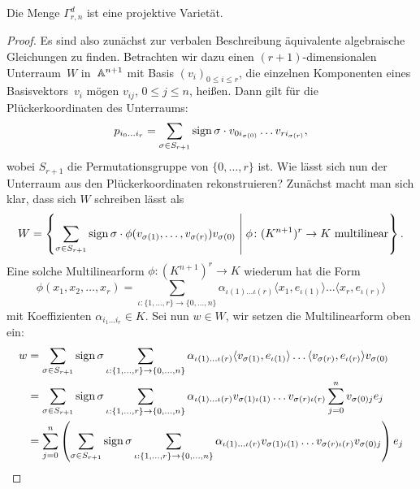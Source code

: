 \begin{fact} \label{fact:gammaproj}
Die Menge $\Gamma_{r,n}^d$ ist eine projektive Varietät.
\end{fact}
\begin{proof}
Es sind also zunächst zur verbalen Beschreibung äquivalente algebraische Gleichungen zu finden. Betrachten wir dazu einen $(r+1)$-dimensionalen Unterraum~$W$ in~$\mathbb A^{n+1}$ mit Basis $(v_i)_{0 \leq i \leq r}$, die einzelnen Komponenten eines Basisvektors~$v_i$ mögen $v_{ij}$, $0 \leq j \leq n$, heißen. Dann gilt für die Plückerkoordinaten des Unterraums:
\begin{equation}
p_{i_0 \dots i_r} = \sum_{\sigma \in S_{r+1}} \operatorname{sign} \sigma \cdot v_{0i_{\sigma(0)}} \dots v_{ri_{\sigma(r)}},
\end{equation}
wobei $S_{r+1}$ die Permutationsgruppe von $\{0,\dots,r\}$ ist. Wie lässt sich nun der Unterraum aus den Plückerkoordinaten rekonstruieren? Zunächst macht man sich klar, dass sich $W$ schreiben lässt als
\begin{equation}
W = \left\{ \sum\limits_{\sigma \in S_{r+1}} \operatorname{sign} \sigma \cdot \phi(v_{\sigma(1)}, \dots, v_{\sigma(r)}) v_{\sigma(0)} \;\middle|\; \phi \colon (K^{n+1})^r \rightarrow K \text{ multilinear} \right\}.
\end{equation}
Eine solche Multilinearform $\phi \colon (K^{n+1})^r \to K$ wiederum hat die Form
\begin{equation}
\phi(x_1, x_2, \dots, x_r) = \sum_{\iota: \{1, \dots, r\} \to \{0, \dots, n\}} \alpha_{\iota(1) \dots \iota(r)} \langle x_1, e_{\iota(1)} \rangle \dots \langle x_r, e_{\iota(r)} \rangle
\end{equation}
mit Koeffizienten $\alpha_{i_1 \dots i_r} \in K$. Sei nun $w \in W$, wir setzen die Multilinearform oben ein:
\begin{align*}
w &= \sum\limits_{\sigma \in S_{r+1}} \sign \sigma \sum_{\iota: \{1, \dots, r\} \to \{0, \dots, n\}} \alpha_{\iota(1) \dots \iota(r)} \langle v_{\sigma(1)}, e_{\iota(1)} \rangle \dots \langle v_{\sigma(r)}, e_{\iota(r)} \rangle v_{\sigma(0)} \\
	&= \sum\limits_{\sigma \in S_{r+1}} \sign \sigma \sum_{\iota: \{1, \dots, r\} \to \{0, \dots, n\}} \alpha_{\iota(1) \dots \iota(r)} v_{\sigma(1)\iota(1)} \dots v_{\sigma(r)\iota(r)} \sum_{j=0}^n v_{\sigma(0)j} e_j \\
	&= \sum_{j=0}^n \left(\sum\limits_{\sigma \in S_{r+1}} \sign \sigma \sum_{\iota: \{1, \dots, r\} \to \{0, \dots, n\}} \alpha_{\iota(1) \dots \iota(r)} v_{\sigma(1)\iota(1)} \dots v_{\sigma(r)\iota(r)} v_{\sigma(0)j}\right) e_j \\

\end{align*}
\end{proof}
